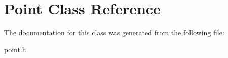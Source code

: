 \hypertarget{class_point}{}\section{Point Class Reference}
\label{class_point}


The documentation for this class was generated from the following file\+:\begin{DoxyCompactItemize}
\item 
point.\+h\end{DoxyCompactItemize}
